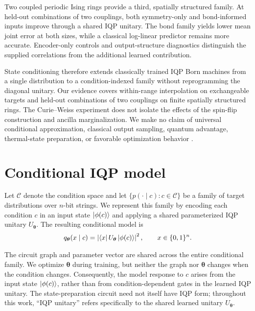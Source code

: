\documentclass[pra,aps,10pt,twocolumn,floatfix,superscriptaddress,
notitlepage,longbibliography]{revtex4-2}
\begin{document}
Two coupled periodic Ising rings provide a third, spatially structured family. At held-out combinations of two couplings, both symmetry-only and bond-informed inputs improve through a shared IQP unitary. The bond family yields lower mean joint error at both sizes, while a classical log-linear predictor remains more accurate. Encoder-only controls and output-structure diagnostics distinguish the supplied correlations from the additional learned contribution.

State conditioning therefore extends classically trained IQP Born machines from a single distribution to a condition-indexed family without reprogramming the diagonal unitary. Our evidence covers within-range interpolation on exchangeable targets and held-out combinations of two couplings on finite spatially structured rings. The Curie--Weiss experiment does not isolate the effects of the spin-flip construction and ancilla marginalization. We make no claim of universal conditional approximation, classical output sampling, quantum advantage, thermal-state preparation, or favorable optimization behavior \cite{shenCharacterizingTrainability2026}.

\section{Conditional IQP model}
Let $\mathcal{C}$ denote the condition space and let $\{p(\cdot\mid c):c\in\mathcal{C}\}$ be a family of target distributions over $n$-bit strings. We represent this family by encoding each condition $c$ in an input state $\ket{\phi(c)}$ and applying a shared parameterized IQP unitary $U_{\boldsymbol{\theta}}$. The resulting conditional model is
\begin{equation}
    q_{\boldsymbol{\theta}}(x\mid c)=\left|\bra{x}U_{\boldsymbol{\theta}}\ket{\phi(c)}\right|^2,
    \qquad x\in\{0,1\}^n .
    \label{eq:cond_sampling}
\end{equation}

The circuit graph and parameter vector are shared across the entire conditional family. We optimize $\boldsymbol{\theta}$ during training, but neither the graph nor $\boldsymbol{\theta}$ changes when the condition changes. Consequently, the model response to $c$ arises from the input state $\ket{\phi(c)}$, rather than from condition-dependent gates in the learned IQP unitary. The state-preparation circuit need not itself have IQP form; throughout this work, ``IQP unitary'' refers specifically to the shared learned unitary $U_{\boldsymbol{\theta}}$.
\end{document}
